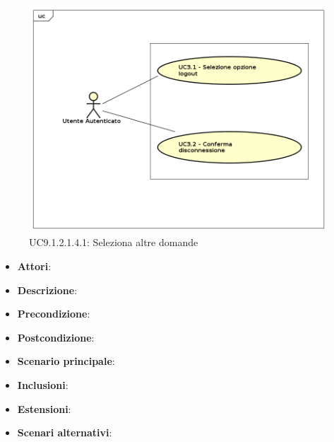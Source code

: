 						\label{UC9.1.2.1.4.1}
						\begin{figure}[h]
							\centering
						\includegraphics[scale=0.7,keepaspectratio]{UML/UC9.png}
							\caption{UC9.1.2.1.4.1: Seleziona altre domande}
						\end{figure}
						\FloatBarrier
						\begin{itemize}
							\item \textbf{Attori}: 
							\item \textbf{Descrizione}: 
							\item \textbf{Precondizione}: 
							\item \textbf{Postcondizione}: 
							\item \textbf{Scenario principale}:
							\item \textbf{Inclusioni}:
							\item \textbf{Estensioni}:
							\item \textbf{Scenari alternativi}:
						\end{itemize}
							
